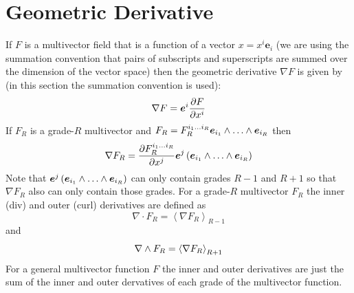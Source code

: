 \documentclass[letterpaper,10pt,english]{sphinxmanual}
\begin{document}
\chapter{Geometric Derivative}
\label{GA:geometric-derivative}\label{GA:deriv}
If $F$ is a multivector field that is a function of a vector
$x = x^{i}\bm{e}_{i}$ (we are using the summation convention that
pairs of subscripts and superscripts are summed over the dimension of the vector
space) then the geometric derivative $\nabla F$ is given by (in this
section the summation convention is used):
\begin{equation*}
  \nabla F = \boldsymbol{e}^{i}\displaystyle\frac{\partial F}{\partial x^{i}}
\end{equation*}
If $F_{R}$ is a grade-$R$ multivector and
$F_{R} = F_{R}^{i_{1}\dots i_{R}}\bm{e}_{i_{1}}\W\dots\W \bm{e}_{i_{R}}$
then
\begin{equation*}
  \nabla F_{R} = \bfrac{\partial F_{R}^{i_{1}\dots i_{R}}}{\partial x^{j}}\bm{e}^{j}\lp\bm{e}_{i_{1}}\W
               \dots\W \bm{e}_{i_{R}} \rp
\end{equation*}
Note that
$\bm{e}^{j}\lp\bm{e}_{i_{1}}\W\dots\W \bm{e}_{i_{R}} \rp$
can only contain grades $R-1$ and $R+1$ so that $\nabla F_{R}$
also can only contain those grades. For a grade-$R$ multivector
$F_{R}$ the inner (div) and outer (curl) derivatives are defined as
\begin{equation*}
\nabla\cdot F_{R} = \left < \nabla F_{R}\right >_{R-1}
\end{equation*}
and
\begin{equation*}
\nabla\wedge F_{R} = \left < \nabla F_{R}\right >_{R+1}
\end{equation*}
For a general multivector function $F$ the inner and outer derivatives are
just the sum of the inner and outer dervatives of each grade of the multivector
function.
\end{document}
